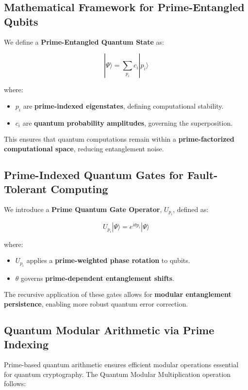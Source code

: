 \documentclass{article}
\theoremstyle{plain}
\theoremstyle{plain}
\theoremstyle{definition}
\theoremstyle{remark}
\begin{document}
\subsection{Mathematical Framework for Prime-Entangled Qubits}

We define a \textbf{Prime-Entangled Quantum State} as:

\begin{equation}
|\Psi\rangle = \sum_{p_i} c_i |p_i\rangle
\end{equation}

where:
\begin{itemize}
    \item $p_i$ are \textbf{prime-indexed eigenstates}, defining computational stability.
    \item $c_i$ are \textbf{quantum probability amplitudes}, governing the superposition.
\end{itemize}

This ensures that quantum computations remain within a \textbf{prime-factorized computational space}, reducing entanglement noise.

\subsection{Prime-Indexed Quantum Gates for Fault-Tolerant Computing}

We introduce a \textbf{Prime Quantum Gate Operator}, $U_{p_i}$, defined as:

\begin{equation}
U_{p_i} |\Psi\rangle = e^{i \theta p_i} |\Psi\rangle
\end{equation}

where:
\begin{itemize}
    \item $U_{p_i}$ applies a \textbf{prime-weighted phase rotation} to qubits.
    \item $\theta$ governs \textbf{prime-dependent entanglement shifts}.
\end{itemize}

The recursive application of these gates allows for \textbf{modular entanglement persistence}, enabling more robust quantum error correction.

\subsection{Quantum Modular Arithmetic via Prime Indexing}

Prime-based quantum arithmetic ensures efficient modular operations essential for quantum cryptography. The Quantum Modular Multiplication operation follows:
\end{document}
